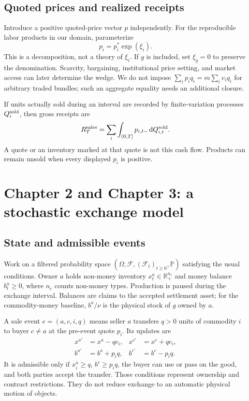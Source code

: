 \documentclass[11pt,letterpaper]{article}
\newcommand{\R}{\mathbb R}
\newcommand{\Pp}{\mathbb P}
\newcommand{\F}{\mathcal F}
\newcommand{\dd}{\,\mathrm d}
\begin{document}
\subsection{Quoted prices and realized receipts}
Introduce a positive quoted-price vector $p$ independently. For the
reproducible labor products in our domain, parameterize
\begin{equation}\label{eq:wedge}
 p_i=p_i^*\exp(\xi_i).
\end{equation}
This is a decomposition, not a theory of $\xi_i$. If $g$ is included,
set $\xi_g=0$ to preserve the denomination. Scarcity, bargaining,
institutional price setting, and market access can later determine the
wedge. We do not impose $\sum_i p_iq_i=m\sum_i v_iq_i$ for arbitrary
traded bundles; such an aggregate equality needs an additional closure.

If units actually sold during an interval are recorded by finite-variation
processes $Q_i^{\rm sold}$, then gross receipts are
\begin{equation}\label{eq:receipts}
 R_T^{\rm sales}=\sum_i\int_{(0,T]}p_{i,t-}\dd Q_{i,t}^{\rm sold}.
\end{equation}
A quote or an inventory marked at that quote is not this cash flow.
Products can remain unsold when every displayed $p_i$ is positive.

\section{Chapter 2 and Chapter 3: a stochastic exchange model}
\subsection{State and admissible events}
Work on a filtered probability space
$(\Omega,\F,(\F_t)_{t\ge0},\Pp)$ satisfying the usual conditions.
Owner $a$ holds non-money inventory $x^a_t\in\R_+^{n_c}$ and money
balance $b^a_t\ge0$, where $n_c$ counts non-money types.
Production is paused during the exchange interval. Balances are claims
to the accepted settlement asset; for the commodity-money baseline,
$b^a/\nu$ is the physical stock of $g$ owned by $a$.

A sale event $e=(a,c,i,q)$ means seller $a$ transfers $q>0$ units of
commodity $i$ to buyer $c\ne a$ at the pre-event quote $p_i$. Its updates
are
\begin{equation}\label{eq:trade}
\begin{aligned}
 x^{a\prime}&=x^a-qe_i,& x^{c\prime}&=x^c+qe_i,\\
 b^{a\prime}&=b^a+p_iq,& b^{c\prime}&=b^c-p_iq.
\end{aligned}
\end{equation}
It is admissible only if $x_i^a\ge q$, $b^c\ge p_iq$, the buyer can
use or pass on the good, and both parties accept the transfer. Those
conditions represent ownership and contract restrictions. They do not
reduce exchange to an automatic physical motion of objects.
\end{document}
